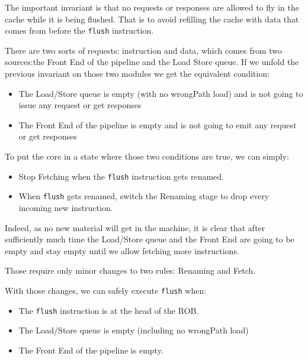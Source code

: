 \documentclass[conference]{IEEEtran}
\begin{document}
The important invariant is that no requests or responses are allowed to fly in the
cache while it is being flushed. That is to avoid refilling the cache with data that
comes from before the \verb|flush| instruction.


There are two sorts of requests: instruction and data, which comes
from two sources:the Front End of the pipeline and the Load Store
queue. If we unfold the previous invariant on those two modules we get
the equivalent condition:
\begin{itemize}
\item The Load/Store queue is empty (with no wrongPath load) and is not going to issue any request or get responses
\item The Front End of the pipeline is empty and is not going to emit any request or get responses
\end{itemize}

To put the core in a state where those two conditions are true, we can simply: %
\begin{itemize}
\item Stop Fetching when the \verb|flush| instruction gets renamed.
\item When \verb|flush| gets renamed, switch the Renaming stage to drop every incoming new instruction.  %
\end{itemize}
Indeed, as no new material will get in the machine, it is clear that after sufficiently
much time the Load/Store queue and the Front End are going to be empty and stay
empty until we allow fetching more instructions.

Those require only minor changes to two rules: Renaming and Fetch.

With those changes, we can safely execute \verb|flush| when:
\begin{itemize}
\item The \verb|flush| instruction is at the head of the ROB. %
\item The Load/Store queue is empty (including no wrongPath load)
\item The Front End of the pipeline is empty.
\end{itemize}
\end{document}
